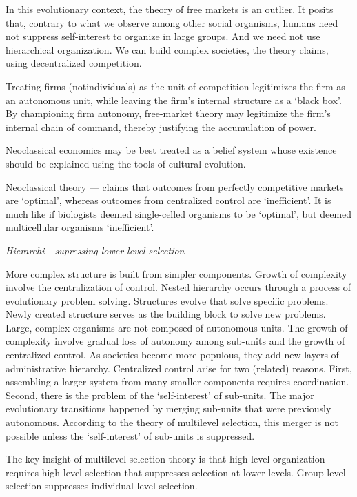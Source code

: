 \documentclass[
]{book}
\begin{document}
In this evolutionary context, the theory of free markets is an outlier. It posits
that, contrary to what we observe among other social organisms, humans need
not suppress self-interest to organize in large groups. And we need not use
hierarchical organization. We can build complex societies, the theory claims,
using decentralized competition.

Treating firms (notindividuals) as the unit of competition
legitimizes the firm as an autonomous unit, while
leaving the firm's internal structure as a `black box'.
By championing firm autonomy, free-market theory may legitimize the firm's
internal chain of command, thereby justifying the accumulation of power.

Neoclassical economics may be best treated as a belief system
whose existence should be explained using the tools of cultural evolution.

Neoclassical theory --- claims that outcomes from perfectly competitive markets
are `optimal', whereas outcomes from centralized control are `inefficient'.
It is much like if biologists deemed single-celled organisms to be `optimal',
but deemed multicellular organisms `inefficient'.

\emph{Hierarchi - supressing lower-level selection}

More complex structure is built from simpler components.
Growth of complexity involve the centralization of control.
Nested hierarchy occurs through a process of evolutionary problem solving.
Structures evolve that solve specific problems.
Newly created structure serves as the building block to solve new problems.
Large, complex organisms are not composed of autonomous units.
The growth of complexity involve gradual loss of autonomy
among sub-units and the growth of centralized control.
As societies become more populous, they add new layers of administrative hierarchy.
Centralized control arise for two (related) reasons.
First, assembling a larger system from many smaller components requires coordination.
Second, there is the problem of the `self-interest' of sub-units. The major
evolutionary transitions happened by merging sub-units that were previously
autonomous. According to the theory of multilevel selection, this merger is not
possible unless the `self-interest' of sub-units is suppressed.

The key insight of multilevel selection theory is that high-level organization
requires high-level selection that suppresses selection at lower levels.
Group-level selection suppresses individual-level selection.
\end{document}
